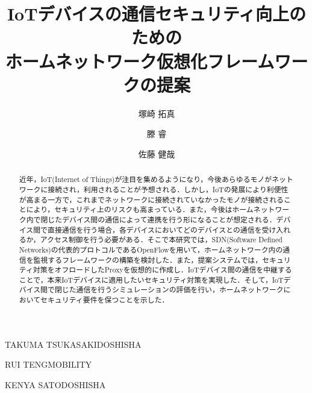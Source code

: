 \documentclass[Japanese]{dicomopapers}
\begin{document}
\title{IoTデバイスの通信セキュリティ向上のための\\ホームネットワーク仮想化フレームワークの提案}


\author{塚崎 拓真}{TAKUMA TSUKASAKI}{DOSHISHA}
\author{滕 睿}{RUI TENG}{MOBILITY}
\author{佐藤 健哉}{KENYA SATO}{DOSHISHA}

\begin{abstract}
	近年，IoT(Internet of Things)が注目を集めるようになり，今後あらゆるモノがネットワークに接続され，利用されることが予想される．しかし，IoTの発展により利便性が高まる一方で，これまでネットワークに接続されていなかったモノが接続されることにより，セキュリティ上のリスクも高まっている．また，今後はホームネットワーク内で閉じたデバイス間の通信によって連携を行う形になることが想定される．デバイス間で直接通信を行う場合，各デバイスにおいてどのデバイスとの通信を受け入れるか，アクセス制御を行う必要がある．そこで本研究では，SDN(Software Defined Networks)の代表的プロトコルであるOpenFlowを用いて，ホームネットワーク内の通信を監視するフレームワークの構築を検討した．また，提案システムでは，セキュリティ対策をオフロードしたProxyを仮想的に作成し．IoTデバイス間の通信を中継することで，本来IoTデバイスに適用したいセキュリティ対策を実現した．そして，IoTデバイス間で閉じた通信を行うシミュレーションの評価を行い，ホームネットワークにおいてセキュリティ要件を保つことを示した．

\end{abstract}

\maketitle

\end{document}
